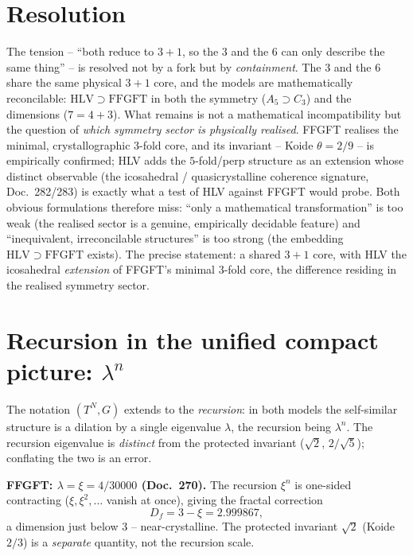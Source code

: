 \section{Resolution}
The tension -- ``both reduce to $3{+}1$, so the $3$ and the $6$ can only describe the same
thing'' -- is resolved not by a fork but by \emph{containment}. The $3$ and the $6$ share
the same physical $3{+}1$ core, and the models are mathematically reconcilable:
$\mathrm{HLV}\supset\mathrm{FFGFT}$ in both the symmetry ($A_5\supset C_3$) and the
dimensions ($7=4+3$). What remains is not a mathematical incompatibility but the question of
\emph{which symmetry sector is physically realised}. FFGFT realises the minimal,
crystallographic $3$-fold core, and its invariant -- Koide $\theta=2/9$ -- is empirically
confirmed; HLV adds the $5$-fold/perp structure as an extension whose distinct observable
(the icosahedral / quasicrystalline coherence signature, Doc.~282/283) is exactly what a
test of HLV against FFGFT would probe. Both obvious formulations therefore miss:
``only a mathematical transformation'' is too weak (the realised sector is a genuine,
empirically decidable feature) and ``inequivalent, irreconcilable structures'' is too strong
(the embedding $\mathrm{HLV}\supset\mathrm{FFGFT}$ exists). The precise statement: a shared
$3{+}1$ core, with HLV the icosahedral \emph{extension} of FFGFT's minimal $3$-fold core,
the difference residing in the realised symmetry sector.

\section{Recursion in the unified compact picture: $\lambda^n$}
The notation $(T^N,G)$ extends to the \emph{recursion}: in both models the self-similar
structure is a dilation by a single eigenvalue $\lambda$, the recursion being $\lambda^n$.
The recursion eigenvalue is \emph{distinct} from the protected invariant ($\sqrt2$,
$2/\sqrt5$); conflating the two is an error.

\textbf{FFGFT: $\lambda=\xi=4/30000$ (Doc.~270).} The recursion $\xi^n$ is one-sided
contracting ($\xi,\xi^2,\dots$ vanish at once), giving the fractal correction
\begin{equation}
D_f = 3-\xi = 2.999867,
\end{equation}
a dimension just below $3$ -- near-crystalline. The protected invariant $\sqrt2$ (Koide
$2/3$) is a \emph{separate} quantity, not the recursion scale.

